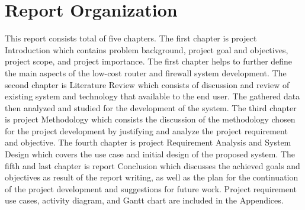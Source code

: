 \documentclass[../index.tex]{subfiles}
\begin{document}
\section{Report Organization}

This report consists total of five chapters. The first chapter is project Introduction which
contains problem background, project goal and objectives, project scope, and project importance. The
first chapter helps to further define the main aspects of the low-cost router and firewall system
development. The second chapter is Literature Review which consists of discussion and review of
existing system and technology that available to the end user. The gathered data then analyzed and
studied for the development of the system. The third chapter is project Methodology which consists
the discussion of the methodology chosen for the project development by justifying and analyze the
project requirement and objective. The fourth chapter is project Requirement Analysis and System
Design which covers the use case and initial design of the proposed system. The fifth and last
chapter is report Conclusion which discusses the achieved goals and objectives as result of the
report writing, as well as the plan for the continuation of the project development and suggestions
for future work. Project requirement use cases, activity diagram, and Gantt chart are included in
the Appendices.
\end{document}
